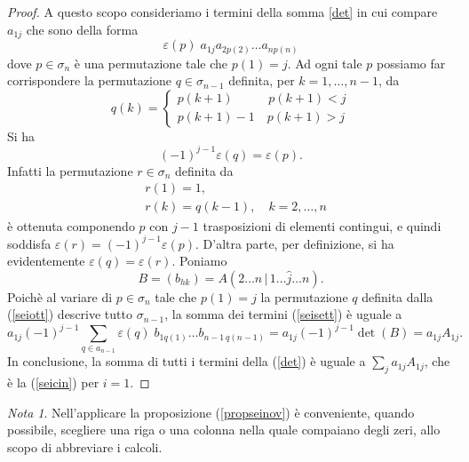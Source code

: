 \documentclass{article}
\theoremstyle{plain}
\theoremstyle{definition}
\theoremstyle{remark}
\newtheorem{note}{Nota}
\begin{document}
\begin{proof}
    A questo scopo consideriamo i termini della somma \ref{det} in cui compare $a_{1j}$ che sono della forma 
    \begin{equation}
        \varepsilon(p)\;a_{1j}a_{2p(2)}\dots a_{np(n)}\label{seisett}
    \end{equation}
    dove $p\in \sigma_n$ è una permutazione tale che $p(1)=j$. Ad ogni tale $p$ possiamo far corrispondere la permutazione $q\in \sigma_{n-1}$ definita, per $k=1,\ldots, n-1$, da 
    \begin{equation}
        q(k)=\begin{cases}
            p(k+1)\quad\quad\;\,\, \ p(k+1)<j\\
            p(k+1)-1\quad p(k+1)>j
        \end{cases}\label{seiott}
    \end{equation}
    Si ha \[(-1)^{j-1}\varepsilon(q)=\varepsilon(p).\]
    Infatti la permutazione $r\in\sigma_n$ definita da 
    \begin{align*}
        &r(1)=1,\\
        &r(k)=q(k-1),\quad k=2,\ldots,n
    \end{align*}
    è ottenuta componendo $p$ con $j-1$ trasposizioni di elementi contingui, e quindi soddisfa $\varepsilon(r)=(-1)^{j-1}\varepsilon(p)$. 
    D'altra parte, per definizione, si ha evidentemente $\varepsilon(q)=\varepsilon(r)$.
    Poniamo 
    \[B=(b_{hk})=A(2\ldots n\,|\,1\ldots\hat{j}\ldots n). \]
    Poichè al variare di $p\in\sigma_n$ tale che $p(1)=j$ la permutazione $q$ definita dalla (\ref{seiott}) descrive tutto $\sigma_{n-1}$, la somma dei termini (\ref{seisett}) è uguale a
    \[a_{1j}(-1)^{j-1}\sum_{q\in a_{n-1}}\varepsilon(q)\;b_{1q(1)}\ldots b_{n-1\,q(n-1)}=a_{1j}(-1)^{j-1}\det(B)=a_{1j}A_{1j}.\]
    In conclusione, la somma di tutti i termini della (\ref{det}) è uguale a $\sum_{j}a_{1j}A_{1j}$, che è la (\ref{seicin}) per $i=1$.
\end{proof}

\vspace{10pt}

\begin{note}
    Nell'applicare la proposizione (\ref{propseinov}) è conveniente, quando possibile, scegliere una riga o una colonna nella quale compaiano degli zeri, allo scopo di abbreviare i calcoli.
\end{note}

\vspace{10pt}
\end{document}
